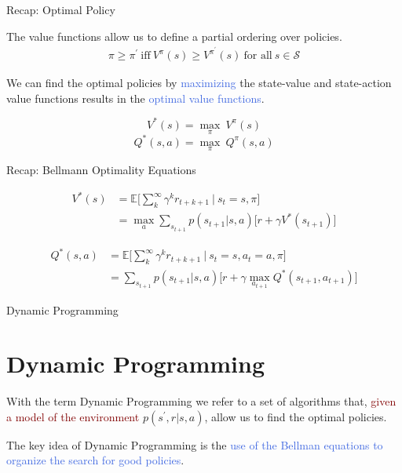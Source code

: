 \documentclass{beamer}
\begin{document}
\begin{frame}{Recap: Optimal Policy}

The value functions allow us to define a partial ordering over policies. 
	\begin{align*}
		\pi \geq \pi^{\prime}\: \text{iff}\: V^{\pi}(s) \geq V^{\pi^{'}}(s) \: \text{for all}\: s\in\mathcal{S}
	\end{align*}
	
	We can find the optimal policies by \textcolor{RoyalBlue}{maximizing} the state-value and state-action value functions results in the \textcolor{RoyalBlue}{optimal value functions}.
	\begin{multicols}{2}
	\begin{equation*}
		V^{*}(s)=\underset{\pi}{\max}\:V^{\pi}(s)
	\end{equation*}\break
	\begin{equation*}
		Q^{*}(s,a)= \underset{\pi}{\max}\:Q^{\pi}(s,a)
	\end{equation*}
	\end{multicols}

\end{frame}

\begin{frame}{Recap: Bellmann Optimality Equations}

   \begin{align*}
	V^{*}(s)& = \mathds{E} \bigg[\sum_{k}^{\infty}\gamma^{k} r_{t+k+1} \: \bigg| \: s_t=s,\pi \bigg] \\
		   & = \max_a \sum_{s_{t+1}} p(s_{t+1}|s,a)\big[r + \gamma V^{*}(s_{t+1}) \big] 
	\end{align*}
	
	   \begin{align*}
	Q^{*}(s,a)& = \mathds{E} \bigg[\sum_{k}^{\infty}\gamma^{k} r_{t+k+1} \: \bigg| \: s_t=s, a_t=a,\pi \bigg] \\
		   & = \sum_{s_{t+1}} p(s_{t+1}|s,a)\big[r + \gamma \max_{a_{t+1}}Q^{*}(s_{t+1}, a_{t+1}) \big] 
	\end{align*}

\end{frame}



\begin{frame}{Dynamic Programming}
\section{Dynamic Programming}

With the term Dynamic Programming we refer to a set of algorithms that, \textcolor{Maroon}{given a model of the environment} $p(s^{\prime}, r| s, a)$, allow us to find the optimal policies.

\vspace{3mm}

The key idea of Dynamic Programming is the \textcolor{RoyalBlue}{use of the Bellman equations to organize the search for good policies}.

\end{frame}
\end{document}
